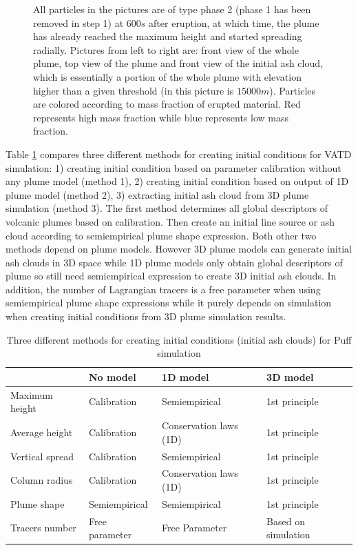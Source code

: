 \documentclass[draft,linenumbers]{agujournal2019}
\begin{document}
\begin{figure}[!htb]
\begin{minipage}{.325 \textwidth}
\end{minipage}%
\caption{All particles in the pictures are of type phase 2 (phase 1 has been removed in step 1) at $600s$ after eruption, at which time, the plume has already reached the maximum height and started spreading radially. Pictures from left to right are: front view of the whole plume, top view of the plume and front view of the initial ash cloud, which is essentially a portion of the whole plume with elevation higher than a given threshold (in this picture is $15000 m$). Particles are colored according to mass fraction of erupted material. Red represents high mass fraction while blue represents low mass fraction.}
\label{fig:Plume-SPH-Pinatubo-ash-cloud}
\end{figure}

Table \ref{tab:VATDs-source-term-determination} compares three different methods for creating initial conditions for VATD simulation: 1) creating initial condition based on parameter calibration without any plume model (method 1), 2) creating initial condition based on output of 1D plume model (method 2), 3) extracting initial ash cloud from 3D plume simulation (method 3). The first method determines all global descriptors of volcanic plumes based on calibration. Then create an initial line source or ash cloud according to semiempirical plume shape expression. Both other two methods depend on plume models. However 3D plume models can generate initial ash clouds in 3D space while 1D plume models only obtain global descriptors of plume so still need semiempirical expression to create 3D initial ash clouds. In addition, the number of Lagrangian tracers is a free parameter when using semiempirical plume shape expressions while it purely depends on simulation when creating initial conditions from 3D plume simulation results.

\begin{table}
\centering
\caption{Three different methods for creating initial conditions (initial ash clouds) for Puff simulation}		
	 \begin{tabular}{p{26.5mm}p{25.5mm}p{36.5mm}p{34.5mm}}
	 \hline
	 		 & No model & 1D model & 3D model \\
	 		 \hline 		
	 Maximum height & Calibration & Semiempirical & 1st principle \\
	 Average height & Calibration & Conservation laws (1D) & 1st principle \\
	 Vertical spread & Calibration & Semiempirical & 1st principle \\
	 Column radius & Calibration & Conservation laws (1D) & 1st principle \\
	 Plume shape & Semiempirical & Semiempirical & 1st principle \\
	 Tracers number & Free parameter & Free Parameter & Based on simulation\\
	 \hline
	 \end{tabular}
	 \label{tab:VATDs-source-term-determination}
\end{table}
\end{document}
